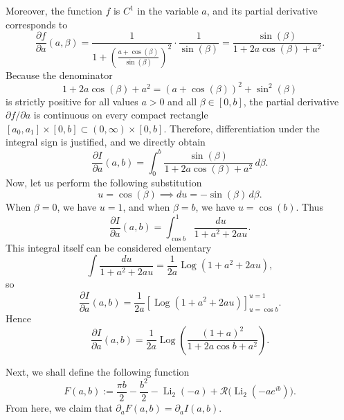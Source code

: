 \documentclass[preprint,12pt,nopreprintline]{elsarticle}
\begin{document}
Moreover, the function \(f\) is \(C^1\) in the variable \(a\), and its partial derivative corresponds to
\begin{equation}
\frac{\partial f}{\partial a}(a,\beta)
=
\frac{1}{1+\left(\frac{a+\cos\left(\beta\right)}{\sin\left(\beta\right)}\right)^2}\cdot \frac{1}{\sin\left(\beta\right)}
=
\frac{\sin\left(\beta\right)}{1+2a\cos\left(\beta\right)+a^2}.
\end{equation}
Because the denominator
\begin{equation}
1+2a\cos\left(\beta\right)+a^2=(a+\cos\left(\beta\right))^2+\sin^2\left(\beta\right)
\end{equation}
is strictly positive for all values \(a>0\) and all \(\beta\in[0,b]\), the partial derivative
\(\partial f/\partial a\) is continuous on every compact rectangle
\([a_0,a_1]\times [0,b]\subset (0,\infty)\times [0,b]\). Therefore, differentiation under
the integral sign is justified, and we directly obtain
\begin{equation}
\frac{\partial I}{\partial a}(a,b)
=
\int_0^b \frac{\sin\left(\beta\right)}{1+2a\cos\left(\beta\right)+a^2}\,d\beta.
\end{equation}
Now, let us perform the following substitution
\begin{equation}
u=\cos\left(\beta\right)\implies du=-\sin\left(\beta\right)\,d\beta.
\end{equation}
When \(\beta=0\), we have \(u=1\), and when \(\beta=b\), we have \(u=\cos \left(b\right)\). Thus
\begin{equation}
\frac{\partial I}{\partial a}(a,b)
=
\int_{\cos b}^{1}\frac{du}{1+a^2+2au}.
\end{equation}
This integral itself can be considered elementary
\begin{equation}
\int \frac{du}{1+a^2+2au}
=
\frac{1}{2a}\operatorname{Log}(1+a^2+2au),
\end{equation}
so
\begin{equation}
\frac{\partial I}{\partial a}(a,b)
=
\frac{1}{2a}
\left[
\operatorname{Log}(1+a^2+2au)
\right]_{u=\cos b}^{u=1}.
\end{equation}
Hence
\begin{equation}\label{eq.24}
\frac{\partial I}{\partial a}(a,b)
=
\frac{1}{2a}
\operatorname{Log}\!\left(\frac{(1+a)^2}{1+2a\cos b+a^2}\right).
\end{equation}

Next, we shall define the following function
\begin{equation}
F(a,b):=
\frac{\pi b}{2}-\frac{b^2}{2}
-\operatorname{Li}_2(-a)
+\mathscr{R}\!\bigl(\operatorname{Li}_2(-ae^{ib})\bigr).
\end{equation}
From here, we claim that \(\partial_a F(a,b)=\partial_a I(a,b)\). 
\end{document}
